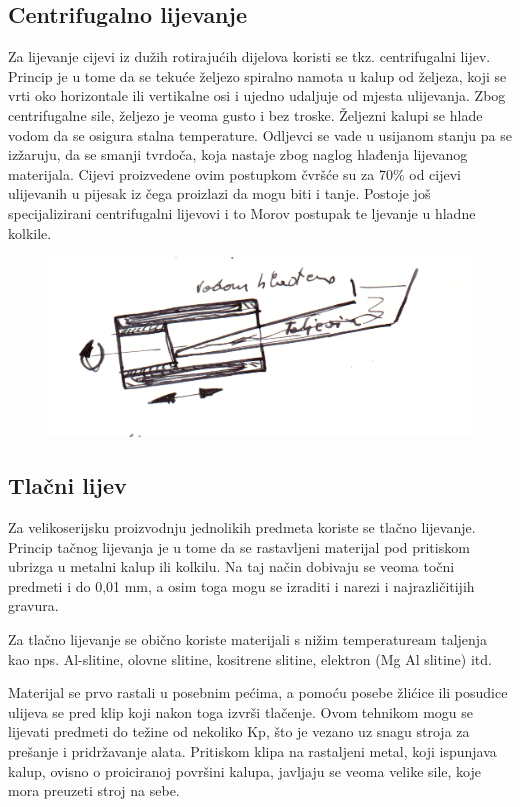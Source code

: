 \documentclass[a4paper,12pt]{article}
\numberwithin{figure}{section}
\begin{document}
\subsection{Centrifugalno lijevanje}
Za lijevanje cijevi iz dužih rotirajućih dijelova koristi se tkz. centrifugalni lijev. Princip je u tome da se tekuće željezo spiralno namota u kalup od željeza, koji se vrti oko horizontale ili vertikalne osi i ujedno udaljuje od mjesta ulijevanja. Zbog centrifugalne sile, željezo je veoma gusto i bez troske. Željezni kalupi se hlade vodom da se osigura stalna temperature. Odljevci se vade u usijanom stanju pa se izžaruju, da se smanji tvrdoča, koja nastaje zbog naglog hlađenja lijevanog materijala. Cijevi proizvedene ovim postupkom čvršće su za 70$\%$ od cijevi ulijevanih u pijesak iz čega proizlazi da mogu biti i tanje. Postoje još specijalizirani centrifugalni lijevovi i to Morov postupak te ljevanje u hladne kolkile.
\begin{figure}[!h]
\centering
\includegraphics[scale=0.17]{image_60-2.png}
\end{figure}
\FloatBarrier
\subsection{Tlačni lijev}
Za velikoserijsku proizvodnju jednolikih predmeta koriste se tlačno lijevanje. Princip tačnog lijevanja je u tome da se rastavljeni materijal pod pritiskom ubrizga u metalni kalup ili kolkilu. Na taj način dobivaju se veoma točni predmeti  i do 0,01 mm, a osim toga mogu se izraditi i narezi i najrazličitijih gravura. \par 
Za tlačno lijevanje se obično koriste materijali s nižim temperatuream taljenja kao nps. Al-slitine, olovne slitine, kositrene slitine, elektron (Mg Al slitine) itd.\par 
Materijal se prvo rastali u posebnim pećima, a pomoću posebe žlićice ili posudice ulijeva se pred klip koji nakon toga izvrši tlačenje. Ovom tehnikom mogu se lijevati predmeti do težine od nekoliko Kp, što je vezano uz snagu stroja za prešanje i pridržavanje alata. Pritiskom klipa na rastaljeni metal, koji ispunjava kalup, ovisno o proiciranoj površini kalupa, javljaju se veoma velike sile, koje mora preuzeti stroj na sebe.
\end{document}
